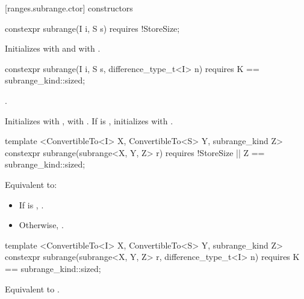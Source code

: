 \begin{addedblock}
[ranges.subrange.ctor]{ constructors}

%
\begin{itemdecl}
constexpr subrange(I i, S s) requires !StoreSize;
\end{itemdecl}

\begin{itemdescr}
\pnum
\effects Initializes  with  and  with
.
\end{itemdescr}

%
\begin{itemdecl}
constexpr subrange(I i, S s, difference_type_t<I> n)
  requires K == subrange_kind::sized;
\end{itemdecl}

\begin{itemdescr}
\pnum
\requires {}.

\pnum
\effects Initializes  with ,  with
. If  is , initializes  with
.
\end{itemdescr}

%
\begin{itemdecl}
template <ConvertibleTo<I> X, ConvertibleTo<S> Y, subrange_kind Z>
constexpr subrange(subrange<X, Y, Z> r)
  requires !StoreSize || Z == subrange_kind::sized;
\end{itemdecl}

\begin{itemdescr}
\pnum
\effects Equivalent to:
\begin{itemize}
\item If  is ,
.
\item Otherwise, .
\end{itemize}
\end{itemdescr}

%
\begin{itemdecl}
template <ConvertibleTo<I> X, ConvertibleTo<S> Y, subrange_kind Z>
constexpr subrange(subrange<X, Y, Z> r, difference_type_t<I> n)
  requires K == subrange_kind::sized;
\end{itemdecl}

\begin{itemdescr}
\pnum
\effects Equivalent to .
\end{itemdescr}


\end{addedblock}
